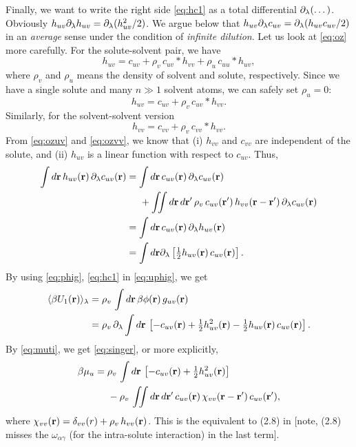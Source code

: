 \documentclass[12pt]{article}
\begin{document}
Finally, we want to write the right side \eqref{eq:hc1} as
a total differential $\partial_\lambda(\dots)$.
%
Obviously $h_{uv} \partial_\lambda h_{uv} = \partial_\lambda ( h_{uv}^2/2 )$.
%
We argue below that $h_{uv} \partial_\lambda c_{uv} = \partial_\lambda ( h_{uv} c_{uv} /2) $
in an \emph{average} sense under the condition of \emph{infinite dilution}.
Let us look at \eqref{eq:oz} more carefully.
%
For the solute-solvent pair, we have
\[
  h_{uv} = c_{uv} + \rho_v \, c_{uv}*h_{vv}
  + \rho_u \, c_{uu}*h_{uv},
\]
where $\rho_v$ and $\rho_u$ means the density of
solvent and solute, respectively.
%
Since we have a single solute and many $n \gg 1$ solvent atoms,
we can safely set $\rho_u = 0$:
\begin{equation}
  h_{uv} = c_{uv} + \rho_v \, c_{uv}*h_{vv}.
  \label{eq:ozuv}
\end{equation}
%
Similarly, for the solvent-solvent version
\begin{equation}
  h_{vv} = c_{vv} + \rho_v \, c_{vv}*h_{vv}.
  \label{eq:ozvv}
\end{equation}
From \eqref{eq:ozuv} and \eqref{eq:ozvv}, we know that
  (i) $h_{vv}$ and $c_{vv}$ are independent of the solute,
  and
  (ii) $h_{uv}$ is a linear function with respect to $c_{uv}$.
%
Thus,
\begin{align}
  \int d\mathbf{r} \, h_{uv}(\mathbf{r}) \, \partial_\lambda c_{uv}(\mathbf{r})
  &=
  \int d\mathbf{r} \,
  c_{uv}(\mathbf{r}) \, \partial_\lambda c_{uv}(\mathbf{r}) \notag \\
  & \;\;\;\;\;
    +
    \iint d\mathbf{r} \, d\mathbf{r}'
    \, \rho_v
    \, c_{uv}(\mathbf{r}')
    \, h_{vv}(\mathbf{r} - \mathbf{r}')
    \, \partial_\lambda c_{uv}(\mathbf{r}) \notag \\
  &= \int d\mathbf{r} \, c_{uv}(\mathbf{r}) \, \partial_\lambda h_{uv}(\mathbf{r}) \notag \\
  &= \int d\mathbf{r} \partial_\lambda
    \left[
      \tfrac{1}{2} h_{uv}(\mathbf{r}) \,  c_{uv}(\mathbf{r})
    \right].
  \label{eq:phig}
\end{align}
%
By using \eqref{eq:phig}, \eqref{eq:hc1} in \eqref{eq:uphig}, we get
%
\begin{align}
  \langle
  \beta U_1(\mathbf{r})
  \rangle_\lambda
  &=
  \rho_v \,
  \int d \mathbf{r}
  \, \beta \phi(\mathbf{r}) \, g_{uv}(\mathbf{r}) \notag \\
  &=
   \rho_v \, \partial_\lambda \int d \mathbf{r} \,
   \left[
    - c_{uv}(\mathbf{r})
    + \tfrac{1}{2} h_{uv}^2(\mathbf{r})
    - \tfrac{1}{2} h_{uv}(\mathbf{r}) \, c_{uv}(\mathbf{r})
    \right].
\end{align}
%
%
%
By \eqref{eq:muti}, we get \eqref{eq:singer}, or more explicitly,
\begin{align}
  \beta \mu_u
  &=
   \rho_v \, \int
    d \mathbf{r} \,
   \left[
    - c_{uv}(\mathbf{r})
    + \tfrac{1}{2} h_{uv}^2(\mathbf{r})
    \right]
  \notag \\
  & \;\;\;\;\;
    -
    \rho_v \, \iint d\mathbf{r} \, d\mathbf{r}'
    \, c_{uv}(\mathbf{r})
    \, \chi_{vv}(\mathbf{r} - \mathbf{r}')
    \, c_{uv}(\mathbf{r}'),
 \label{eq:muexpanded}
\end{align}
where
$\chi_{vv}(\mathbf{r}) = \delta_{vv}(r) + \rho_v \, h_{vv}(\mathbf{r})$.
%
This is the equivalent to (2.8) in \cite{singer}
[note,
(2.8) misses the $\omega_{\alpha\gamma}$ (for the intra-solute interaction)
in the last term].
\end{document}
